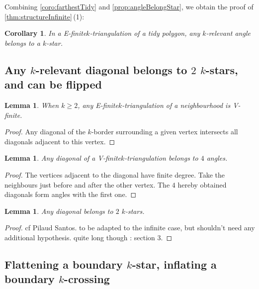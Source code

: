 \documentclass{amsart}
\newtheorem{lemma}[theorem]{Lemma}
\newtheorem{corollary}[theorem]{Corollary}
\theoremstyle{remark}
\newcommand*{\nbd}[0]{neighbourhood\xspace}
\newcommand*{\ef}[0]{E-finite\xspace}
\newcommand*{\vf}[0]{V-finite\xspace}
\newcommand*{\ktg}[0]{$k$-triangulation\xspace}
\begin{document}
Combining \cref{coro:farthestTidy} and \cref{prop:angleBelongStar}, we obtain the proof of \cref{thm:structureInfinite}\,(1):

\begin{corollary}
In a \ef \ktg of a tidy polygon, any $k$-relevant angle belongs to a $k$-star.
\end{corollary}


\subsection{Any $k$-relevant diagonal belongs to $2$ $k$-stars, and can be flipped}

\begin{lemma}
When $k\geq 2$, any \ef \ktg of a \nbd is \vf.
\end{lemma}
\begin{proof}
Any diagonal of the $k$-border surrounding a given vertex intersects all diagonals adjacent to this vertex.
\end{proof}

\begin{lemma}
Any diagonal of a \vf \ktg belongs to $4$ angles.
\end{lemma}
\begin{proof}
The vertices adjacent to the diagonal have finite degree. Take the neighbours just before and after the other vertex. The $4$ hereby obtained diagonals form angles with the first one.
\end{proof}

\begin{lemma}
Any diagonal belongs to $2$ $k$-stars.
\end{lemma}
\begin{proof}
cf Pilaud Santos. to be adapted to the infinite case, but shouldn't need any additional hypothesis. quite long though : section 3.
\end{proof}

\subsection{Flattening a boundary $k$-star, inflating a boundary $k$-crossing}
\end{document}
